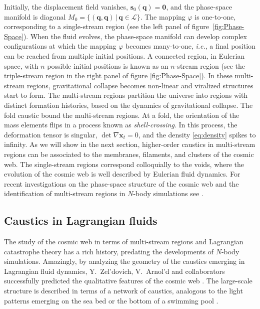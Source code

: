 \documentclass[a4paper, 11pt]{article}
\begin{document}
Initially, the displacement field vanishes, $\bm{s}_0(\bm{q})=\bm{0}$, and the phase-space manifold is diagonal $M_0=\{(\bm{q},\bm{q})\,|\,\bm{q} \in \mathcal{L}\}$. The mapping $\varphi$ is one-to-one, corresponding to a single-stream region (see the left panel of figure\ \ref{fig:Phase-Space}). When the fluid evolves, the phase-space manifold can develop complex configurations at which the mapping $\varphi$ becomes many-to-one, \textit{i.e.}, a final position can be reached from multiple initial positions. A connected region, in Eulerian space, with $n$ possible initial positions is known as an $n$-stream region (see the triple-stream region in the right panel of figure \ref{fig:Phase-Space}). In these multi-stream regions, gravitational collapse becomes non-linear and viralized structures start to form. The multi-stream regions partition the universe into regions with distinct formation histories, based on the dynamics of gravitational collapse. The fold caustic bound the multi-stream regions. At a fold, the orientation of the mass elements flips in a process known as \textit{shell-crossing}. In this process, the deformation tensor is singular, $\det \nabla \bm{x}_t = 0$, and the density \eqref{eq:density} spikes to infinity. As we will show in the next section, higher-order caustics in multi-stream regions can be associated to the membranes, filaments, and clusters of the cosmic web. The single-stream regions correspond colloquially to the voids, where the evolution of the cosmic web is well described by Eulerian fluid dynamics. For recent investigations on the phase-space structure of the cosmic web and the identification of multi-stream regions in $N$-body simulations see \cite{Hahn:2007, Abel:2012, Shandarin:2012,  Feldbrugge:2014b, Ramachandra:2015, Ramachandra:2017, Shandarin:2019, Shandarin:2021}.

\subsection{Caustics in Lagrangian fluids}
The study of the cosmic web in terms of multi-stream regions and Lagrangian catastrophe theory has a rich history, predating the developments of $N$-body simulations. Amazingly, by analyzing the geometry of the caustics emerging in Lagrangian fluid dynamics, Y.\ Zel'dovich, V.\ Arnol'd and collaborators successfully predicted the qualitative features of the cosmic web \cite{Arnold:1982a, Arnold:1982b, Shandarin:1983, Rozhanskii:1984, Shandarin:1989}. The large-scale structure is described in terms of a network of caustics, analogous to the light patterns emerging on the sea bed or the bottom of a swimming pool \cite{Berry:1977, Berry:1980, Feldbrugge:2019}. 
\end{document}
